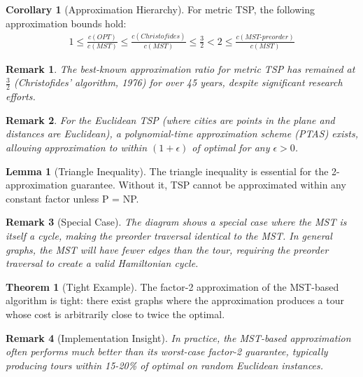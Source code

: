 \documentclass{article}
\newtheorem{remark}{Remark}
\theoremstyle{definition}
\newtheorem{theorem}{Theorem}
\newtheorem{lemma}{Lemma}
\newtheorem{corollary}{Corollary}
\begin{document}
\begin{corollary}[Approximation Hierarchy]
For metric TSP, the following approximation bounds hold:
\begin{align}
1 \leq \frac{c(OPT)}{c(MST)} \leq \frac{c(Christofides)}{c(MST)} \leq \frac{3}{2} < 2 \leq \frac{c(MST\text{-}preorder)}{c(MST)}
\end{align}
\end{corollary}

\begin{remark}
The best-known approximation ratio for metric TSP has remained at $\frac{3}{2}$ (Christofides' algorithm, 1976) for over 45 years, despite significant research efforts.
\end{remark}

\begin{remark}
For the Euclidean TSP (where cities are points in the plane and distances are Euclidean), a polynomial-time approximation scheme (PTAS) exists, allowing approximation to within $(1+\epsilon)$ of optimal for any $\epsilon > 0$.
\end{remark}

\begin{lemma}[Triangle Inequality]
The triangle inequality is essential for the 2-approximation guarantee. Without it, TSP cannot be approximated within any constant factor unless P = NP.
\end{lemma}

\begin{remark}[Special Case]
The diagram shows a special case where the MST is itself a cycle, making the preorder traversal identical to the MST. In general graphs, the MST will have fewer edges than the tour, requiring the preorder traversal to create a valid Hamiltonian cycle.
\end{remark}

\begin{theorem}[Tight Example]
The factor-2 approximation of the MST-based algorithm is tight: there exist graphs where the approximation produces a tour whose cost is arbitrarily close to twice the optimal.
\end{theorem}

\begin{remark}[Implementation Insight]
In practice, the MST-based approximation often performs much better than its worst-case factor-2 guarantee, typically producing tours within 15-20\% of optimal on random Euclidean instances.
\end{remark}
\end{document}
